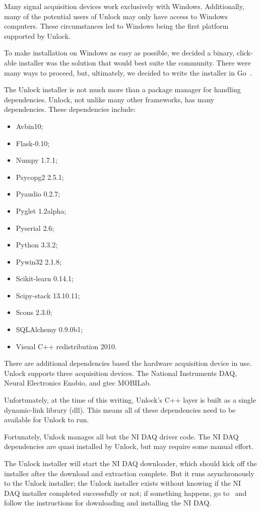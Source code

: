 \documentclass[11pt]{article}
\begin{document}
Many signal acquisition devices work exclusively with Windows.  Additionally, many of the potential users of Unlock may only have access to Windows computers.  These circumstances led to Windows being the first platform supported by Unlock.

To make installation on Windows as easy as possible, we decided a binary, click-able installer was the solution that would best suite the community.  There were many ways to proceed, but, ultimately, we decided to write the installer in Go~\cite{golang}.  

The Unlock installer is not much more than a package manager for handling dependencies.  Unlock, not unlike many other frameworks, has many dependencies.  These dependencies include:
\begin{itemize}
\item Avbin10;
\item Flask-0.10;
\item Numpy 1.7.1;
\item Psycopg2 2.5.1;
\item Pyaudio 0.2.7;
\item Pyglet 1.2alpha;
\item Pyserial 2.6;
\item Python 3.3.2;
\item Pywin32 2.1.8;
\item Scikit-learn 0.14.1;
\item Scipy-stack 13.10.11;
\item Scons 2.3.0;
\item SQLAlchemy 0.9.0b1;
\item Visual C++ redistribution 2010.
\end{itemize}

There are additional dependencies based the hardware acquisition device in use.  Unlock supports three acquisition devices.  The National Instruments DAQ, Neural Electronics Enobio, and gtec MOBILab.  

Unfortunately, at the time of this writing, Unlock's C++ layer is built as a single dynamic-link library (dll).  This means all of these dependencies need to be available for Unlock to run.  

Fortunately, Unlock manages all but the NI DAQ driver code.  The NI DAQ dependencies are quasi installed by Unlock, but may require some manual effort.  

The Unlock installer will start the NI DAQ downloader, which should kick off the installer after the download and extraction complete.  But it runs asynchronously to the Unlock installer; the Unlock installer exists without knowing if the NI DAQ installer completed successfully or not; if something happens, go to~\cite{nidaq} and follow the instructions for downloading and installing the NI DAQ.
\end{document}
